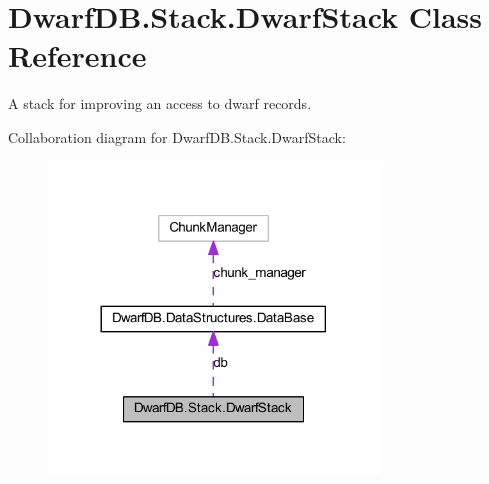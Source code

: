 \hypertarget{class_dwarf_d_b_1_1_stack_1_1_dwarf_stack}{
\section{DwarfDB.Stack.DwarfStack Class Reference}
\label{class_dwarf_d_b_1_1_stack_1_1_dwarf_stack}
}


A stack for improving an access to dwarf records.  




Collaboration diagram for DwarfDB.Stack.DwarfStack:
\nopagebreak
\begin{figure}[H]
\begin{center}
\leavevmode
\includegraphics[width=248pt]{class_dwarf_d_b_1_1_stack_1_1_dwarf_stack__coll__graph}
\end{center}
\end{figure}
